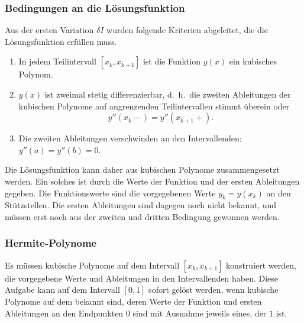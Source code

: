 %
%
\subsubsection{Bedingungen an die Lösungsfunktion}
Aus der ersten Variation $\delta I$ wurden folgende Kriterien abgeleitet,
die die Lösungsfunktion erfüllen muss.
\begin{enumerate}
\item
In jedem Teilintervall $[x_k,x_{k+1}]$ ist die Funktion $y(x)$ ein 
kubisches Polynom.
\item
$y(x)$ ist zweimal stetig differenzierbar, d.~h.~die zweiten Ableitungen
der kubischen Polynome auf angrenzenden Teilintervallen stimmt überein oder
\[
y''(x_k-) = y''(x_{k+1}+).
\]
\item
Die zweiten Ableitungen verschwinden an den Intervallenden: $y''(a)=y''(b)=0$.
\end{enumerate}
Die Lösungsfunktion kann daher aus kubischen Polynome zusammengesetzt werden.
Ein solches ist durch die Werte der Funktion und der ersten Ableitungen
gegeben.
Die Funktionswerte sind die vorgegebenen Werte $y_k=y(x_k)$ an den
Stützstellen.
Die ersten Ableitungen sind dagegen noch nicht bekannt, und müssen erst noch
aus der zweiten und dritten Bedingung gewonnen werden.

%
%
\subsubsection{Hermite-Polynome}
Es müssen kubische Polynome auf dem Intervall $[x_k,x_{k+1}]$ konstruiert
werden, die vorgegebene Werte und Ableitungen in den Intervallenden haben.
Diese Aufgabe kann auf dem Intervall $[0,1]$ sofort gelöst werden,
wenn kubische Polynome auf dem bekannt sind, deren Werte der Funktion
und ersten Ableitungen an den Endpunkten $0$ sind mit Ausnahme jeweils eines,
der $1$ ist.

